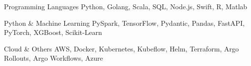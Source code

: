 \begin{cvskills}

  \cvskill
    {Programming Languages}
    {Python, Golang, Scala, SQL, Node.js, Swift, R, Matlab}

  \cvskill
    {Python \& Machine Learning}
    {PySpark, TensorFlow, Pydantic, Pandas, FastAPI, PyTorch, XGBoost, Scikit-Learn}

  \cvskill
    {Cloud \& Others}
    {AWS, Docker, Kubernetes, Kubeflow, Helm, Terraform, Argo Rollouts, Argo Workflows, Azure}

\end{cvskills}
